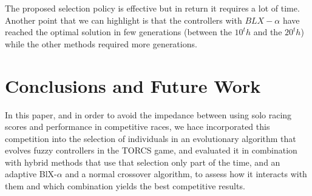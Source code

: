 \documentclass[10pt,journal,compsoc]{IEEEtran}
\begin{document}
The proposed selection policy is effective but in return it requires a
lot of time.%
%
Another point that we can highlight is that the controllers with
$BLX-\alpha$ have reached the optimal solution in few generations
(between the $10^th$ and the $20^th$) while the other methods required more
generations. 


\section{Conclusions and Future Work} 
\label{sec:conclusions}

In this paper, and in order to avoid the impedance between using solo
racing scores and performance in competitive races, we hace
incorporated this competition into the selection of individuals in an
evolutionary algorithm that evolves fuzzy controllers in the TORCS
game, and evaluated it in combination with hybrid methods that use
that selection only part of the time, and an adaptive BlX-$\alpha$ and
a normal crossover algorithm, to assess how it interacts with them and
which combination yields the best competitive results.


\end{document}
